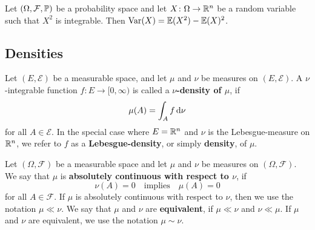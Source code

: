 \begin{proposition}
    \label{prop:variance-identity}
    Let $(\Omega, \mathcal{F}, \mathbb{P})$ be a probability space and let $X\colon \Omega \to \mathbb{R}^n$
    be a random variable such that $X^2$ is integrable. Then $\operatorname{Var}(X) = \mathbb{E}(X^2) - \mathbb{E}(X)^2$.
\end{proposition}

\subsection{Densities}

\begin{definition}[Density]
    Let $(E, \mathcal{E})$ be a measurable space, and let $\mu$ and $\nu$
    be measures on $(E, \mathcal{E})$.
    A $\nu$-integrable function $f\colon E\to [0,\infty)$
    is called a \textbf{$\nu$-density of $\mu$}, if
    \[
        \mu(A) = \int_{A} f \, \textnormal{d}\nu
    \]
    for all $A\in \mathcal{E}$. In the special case where $E = \mathbb{R}^n$ and
    $\nu$ is the Lebesgue-measure on $\mathbb{R}^n$,
    we refer to $f$ as a \textbf{Lebesgue-density}, or simply \textbf{density}, of $\mu$.
\end{definition}

\begin{definition}
    Let $(\Omega, \mathcal{F})$ be a measurable space and let $\mu$ and $\nu$ be measures
    on $(\Omega, \mathcal{F})$.
    We say that $\mu$ is \textbf{absolutely continuous with respect to $\nu$},
    if
    \[
        \nu(A) = 0 \quad\text{implies}\quad \mu(A) = 0
    \]
    for all $A\in\mathcal{F}$. If $\mu$ is absolutely continuous with respect to $\nu$,
    then we use the notation $\mu \ll \nu$.
    We say that $\mu$ and $\nu$
    are \textbf{equivalent}, if $\mu \ll \nu$ and $\nu \ll \mu$.
    If $\mu$ and $\nu$ are equivalent, we use the notation $\mu \sim \nu$.
\end{definition}

